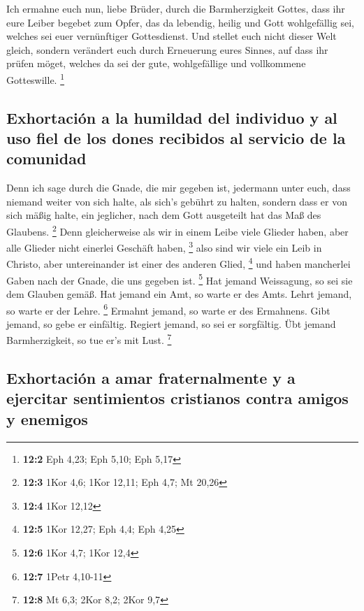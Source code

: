  Ich ermahne euch nun, liebe Brüder, durch die
Barmherzigkeit Gottes, dass ihr eure Leiber begebet zum Opfer, das da
lebendig, heilig und Gott wohlgefällig sei, welches sei euer
vernünftiger Gottesdienst.  Und stellet euch nicht dieser
Welt gleich, sondern verändert euch durch Erneuerung eures Sinnes, auf
dass ihr prüfen möget, welches da sei der gute, wohlgefällige und
vollkommene Gotteswille. \footnote{\textbf{12:2} Eph 4,23; Eph 5,10; Eph
  5,17}

\hypertarget{exhortaciuxf3n-a-la-humildad-del-individuo-y-al-uso-fiel-de-los-dones-recibidos-al-servicio-de-la-comunidad}{%
\subsection{Exhortación a la humildad del individuo y al uso fiel de los
dones recibidos al servicio de la
comunidad}\label{exhortaciuxf3n-a-la-humildad-del-individuo-y-al-uso-fiel-de-los-dones-recibidos-al-servicio-de-la-comunidad}}

 Denn ich sage durch die Gnade, die mir gegeben ist,
jedermann unter euch, dass niemand weiter von sich halte, als sich's
gebührt zu halten, sondern dass er von sich mäßig halte, ein jeglicher,
nach dem Gott ausgeteilt hat das Maß des Glaubens. \footnote{\textbf{12:3}
  1Kor 4,6; 1Kor 12,11; Eph 4,7; Mt 20,26}  Denn
gleicherweise als wir in einem Leibe viele Glieder haben, aber alle
Glieder nicht einerlei Geschäft haben, \footnote{\textbf{12:4} 1Kor
  12,12}  also sind wir viele ein Leib in Christo, aber
untereinander ist einer des anderen Glied, \footnote{\textbf{12:5} 1Kor
  12,27; Eph 4,4; Eph 4,25}  und haben mancherlei Gaben
nach der Gnade, die uns gegeben ist. \footnote{\textbf{12:6} 1Kor 4,7;
  1Kor 12,4}  Hat jemand Weissagung, so sei sie dem
Glauben gemäß. Hat jemand ein Amt, so warte er des Amts. Lehrt jemand,
so warte er der Lehre. \footnote{\textbf{12:7} 1Petr 4,10-11}
 Ermahnt jemand, so warte er des Ermahnens. Gibt jemand,
so gebe er einfältig. Regiert jemand, so sei er sorgfältig. Übt jemand
Barmherzigkeit, so tue er's mit Lust. \footnote{\textbf{12:8} Mt 6,3;
  2Kor 8,2; 2Kor 9,7}

\hypertarget{exhortaciuxf3n-a-amar-fraternalmente-y-a-ejercitar-sentimientos-cristianos-contra-amigos-y-enemigos}{%
\subsection{Exhortación a amar fraternalmente y a ejercitar sentimientos
cristianos contra amigos y
enemigos}\label{exhortaciuxf3n-a-amar-fraternalmente-y-a-ejercitar-sentimientos-cristianos-contra-amigos-y-enemigos}}

